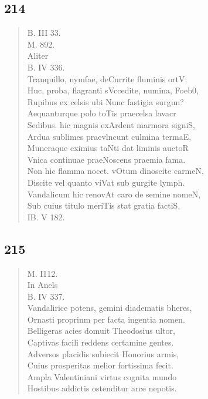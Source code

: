 \documentclass[11pt, a4paper]{report}
\begin{document}
            \subsection*{214}
      \begin{verse}
      B. III 33. \\ M. 892. \\ Aliter \\ B. IV 336. \\ Tranquillo, nymfae, deCurrite fluminis ortV; \\ Huc, proba, flagranti sVccedite, numina, Foeb0, \\ Rupibus ex celsis ubi Nunc fastigia surgun? \\ Aequanturque polo toTis praecelsa lavacr \\ Sedibus. hic magnis exArdent marmora signiS, \\ Ardua sublimes praevlncunt culmina termaE, \\ Muneraque eximius taNti dat liminis auctoR \\ Vnica continuae praeNoscens praemia fama. \\ Non hic flamma nocet. vOtum dinoscite carmeN, \\ Discite vel quanto viVat sub gurgite lymph. \\ Vandalicum hic renovAt caro de semine nomeN, \\ Sub cuius titulo meriTis stat gratia factiS. \\ IB. V 182. \\ 
      \end{verse}
  
            \subsection*{215}
      \begin{verse}
      M. I112. \\ In Anels \\ B. IV 337. \\ Vandalirice potens, gemini diadematis bheres, \\ Ornasti proprinm per facta ingentia nomen. \\ 
        ﻿\pagebreak 
    Belligeras acies domuit Theodosius ultor, \\ Captivas facili reddens certamine gentes. \\ Adversos placidis subiecit Honorius armis, \\ Cuius prosperitas melior fortissima fecit. \\ Ampla Valentiniani virtus cognita mundo \\ Hostibus addictis ostenditur arce nepotis. \\ 
      \end{verse}
  
\end{document}

